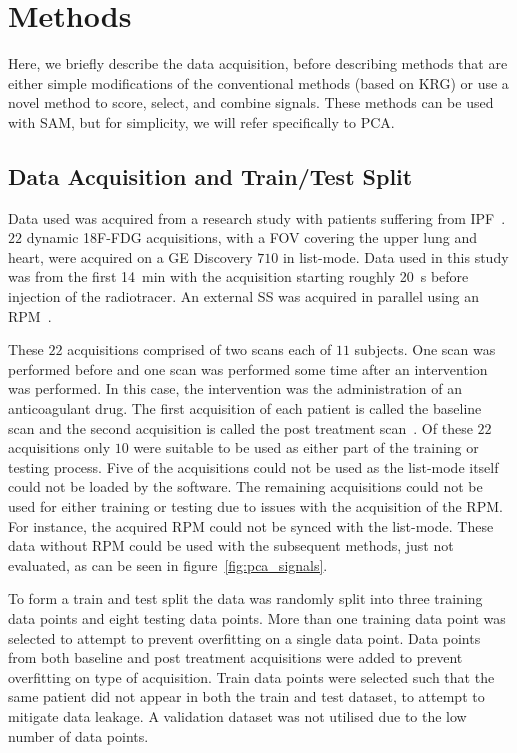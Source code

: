 \section{Methods} \label{sec:methods}
    Here, we briefly describe the data acquisition, before describing methods that are either simple modifications of the conventional methods (based on \gls{KRG}) or use a novel method to score, select, and combine signals. These methods can be used with \gls{SAM}, but for simplicity, we will refer specifically to \gls{PCA}.

    \subsection{Data Acquisition and Train/Test Split} \label{sec:data_acquisition_and_train_test_split}
        Data used was acquired from a research study with patients suffering from \gls{IPF}~\parencite{Emond2020EffectReconstruction}. $22$ dynamic \gls{18F-FDG} acquisitions, with a \gls{FOV} covering the upper lung and heart, were acquired on a \gls{GE} Discovery $710$ in list-mode. Data used in this study was from the first \SI{14}{\minute} with the acquisition starting roughly \SI{20}{\second} before injection of the radiotracer. An external \gls{SS} was acquired in parallel using an \gls{RPM}~\parencite{Oh2019OptimalTreatment}.

        These $22$ acquisitions comprised of two scans each of $11$ subjects. One scan was performed before and one scan was performed some time after an intervention was performed. In this case, the intervention was the administration of an anticoagulant drug. The first acquisition of each patient is called the baseline scan and the second acquisition is called the post treatment scan~\parencite{Emond2020EffectReconstruction}. Of these $22$ acquisitions only $10$ were suitable to be used as either part of the training or testing process. Five of the acquisitions could not be used as the list-mode itself could not be loaded by the software. The remaining acquisitions could not be used for either training or testing due to issues with the acquisition of the \gls{RPM}. For instance, the acquired \gls{RPM} could not be synced with the list-mode. These data without \gls{RPM} could be used with the subsequent methods, just not evaluated, as can be seen in figure~\ref{fig:pca_signals}.

        To form a train and test split the data was randomly split into three training data points and eight testing data points. More than one training data point was selected to attempt to prevent overfitting on a single data point. Data points from both baseline and post treatment acquisitions were added to prevent overfitting on type of acquisition. Train data points were selected such that the same patient did not appear in both the train and test dataset, to attempt to mitigate data leakage. A validation dataset was not utilised due to the low number of data points.

